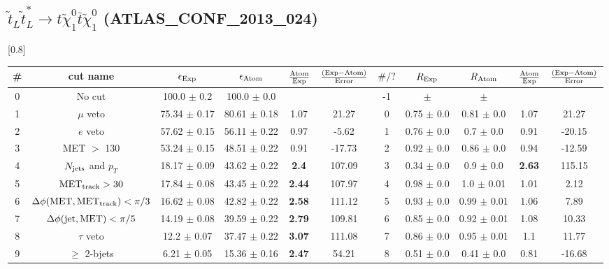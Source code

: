 \documentclass[12pt]{article}
\begin{document}
    
\subsection*{$\tilde t_L \tilde t_L^* \to t \tilde \chi_1^0 \bar t \tilde \chi_1^0$ (ATLAS\_CONF\_2013\_024)} 


\renewcommand{\arraystretch}{1.3}
\begin{table}[h!]
\begin{center}
\scalebox{0.7}[0.8]{ 
\begin{tabular}{c|c||c|c|>{\columncolor{yellow}}c|c||c|c|c|>{\columncolor{yellow}}c|c}
\hline
\# & cut name & $\epsilon_{\rm Exp}$ & $\epsilon_{\rm Atom}$ & $\frac{\rm Atom}{\rm Exp}$ & $\frac{({\rm Exp} - {\rm Atom})}{\rm Error}$ & $\#/?$ & $R_{\rm Exp}$ & $R_{\rm Atom}$ & $\frac{\rm Atom}{\rm Exp}$ & $\frac{({\rm Exp} - {\rm Atom})}{\rm Error}$ \\
\hline
0 & No cut & 100.0 $\pm$ 0.2 & 100.0 $\pm$ 0.0 &  &  & -1 &  $\pm$  &  $\pm$  &  &  \\
1 & $\mu$ veto & 75.34 $\pm$ 0.17 & 80.61 $\pm$ 0.18 & 1.07 & 21.27 & 0 & 0.75 $\pm$ 0.0 & 0.81 $\pm$ 0.0 & 1.07 & 21.27 \\
2 & $e$ veto & 57.62 $\pm$ 0.15 & 56.11 $\pm$ 0.22 & 0.97 & -5.62 & 1 & 0.76 $\pm$ 0.0 & 0.7 $\pm$ 0.0 & 0.91 & -20.15 \\
3 & MET $>$ 130 & 53.24 $\pm$ 0.15 & 48.51 $\pm$ 0.22 & 0.91 & -17.73 & 2 & 0.92 $\pm$ 0.0 & 0.86 $\pm$ 0.0 & 0.94 & -12.59 \\
4 & \cellcolor{magenta} $N_{\rm jets}$ and $p_T$ & 18.17 $\pm$ 0.09 & 43.62 $\pm$ 0.22 & \color{red}\bf 2.4 & 107.09 & 3 & 0.34 $\pm$ 0.0 & 0.9 $\pm$ 0.0 & \color{red}\bf 2.63 & 115.15 \\
5 & $\rm MET_{track} > 30$ & 17.84 $\pm$ 0.08 & 43.45 $\pm$ 0.22 & \color{red}\bf 2.44 & 107.97 & 4 & 0.98 $\pm$ 0.0 & 1.0 $\pm$ 0.01 & 1.01 & 2.12 \\
6 & $\Delta \phi (\rm MET, MET_{track}) < \pi/3$ & 16.62 $\pm$ 0.08 & 42.82 $\pm$ 0.22 & \color{red}\bf 2.58 & 111.12 & 5 & 0.93 $\pm$ 0.0 & 0.99 $\pm$ 0.01 & 1.06 & 7.89 \\
7 & $\Delta \phi (\rm jet, MET) < \pi/5$ & 14.19 $\pm$ 0.08 & 39.59 $\pm$ 0.22 & \color{red}\bf 2.79 & 109.81 & 6 & 0.85 $\pm$ 0.0 & 0.92 $\pm$ 0.01 & 1.08 & 10.33 \\
8 & $\tau$ veto & 12.2 $\pm$ 0.07 & 37.47 $\pm$ 0.22 & \color{red}\bf 3.07 & 111.08 & 7 & 0.86 $\pm$ 0.0 & 0.95 $\pm$ 0.01 & 1.1 & 11.77 \\
9 & $\ge$ 2-bjets & 6.21 $\pm$ 0.05 & 15.36 $\pm$ 0.16 & \color{red}\bf 2.47 & 54.21 & 8 & 0.51 $\pm$ 0.0 & 0.41 $\pm$ 0.0 & 0.81 & -16.68 \\

\end{tabular}}
\end{center}
\end{table}
\end{document}
